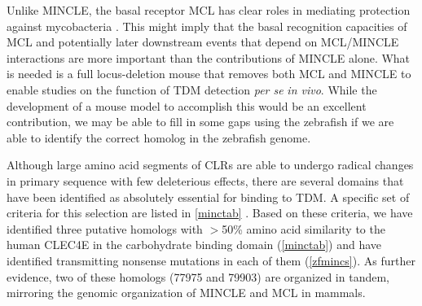 Unlike MINCLE, the basal receptor MCL has clear roles in mediating protection against mycobacteria \citep{Wilson2015}. This might imply that the basal recognition capacities of MCL and potentially later downstream events that depend on MCL/MINCLE interactions are more important than the contributions of MINCLE alone. What is needed is a full locus-deletion mouse that removes both MCL and MINCLE to enable studies on the function of TDM detection \textit{per se} \textit{in vivo}. While the development of a mouse model to accomplish this would be an excellent contribution, we may be able to fill in some gaps using the zebrafish if we are able to identify the correct homolog in the zebrafish genome.

Although large amino acid segments of CLRs are able to undergo radical changes in primary sequence with few deleterious effects, there are several domains that have been identified as absolutely essential for binding to TDM. A specific set of criteria for this selection are listed in \autoref{minctab} \citep{Alenton2017, Feinberg2016, Feinberg2013, Bird2018, Furukawa2013, Zelensky2005}. Based on these criteria, we have identified three putative homologs with $>$50\% amino acid similarity to the human CLEC4E in the carbohydrate binding domain (\autoref{minctab}) and have identified transmitting nonsense mutations in each of them (\autoref{zfmincs}). As further evidence, two of these homologs (77975 and 79903) are organized in tandem, mirroring the genomic organization of MINCLE and MCL in mammals. 

